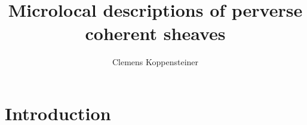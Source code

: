 \documentclass[english]{thesis}
\title{Microlocal descriptions of perverse coherent sheaves}
\author{Clemens Koppensteiner}
\begin{document}
\frontmatter

\maketitlepage

\tableofcontents

\mainmatter

\chapter{Introduction}








\backmatter

\printbibliography
\end{document}
